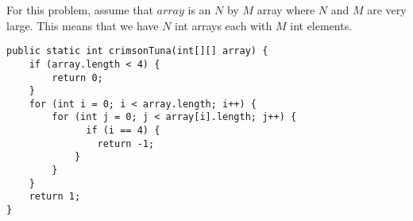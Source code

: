 \begin{blocksection}
\question

For this problem, assume that $array$ is an $N$ by $M$ array where $N$ and $M$ are very large. This means that we have $N$ int arrays each with $M$ int elements.\\

\begin{lstlisting}
public static int crimsonTuna(int[][] array) {
    if (array.length < 4) {
        return 0;
    }
    for (int i = 0; i < array.length; i++) {
        for (int j = 0; j < array[i].length; j++) {
              if (i == 4) {
                return -1;
            }
        }
    }
    return 1;
}
\end{lstlisting}
\end{blocksection}

